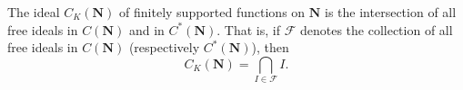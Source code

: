 The ideal $C_K(\mathbf{N})$ of finitely supported functions on $\mathbf{N}$ is the intersection of all free ideals in $C(\mathbf{N})$ and in $C^*(\mathbf{N})$. That is, if $\mathcal{F}$ denotes the collection of all free ideals in $C(\mathbf{N})$ (respectively $C^*(\mathbf{N})$), then
$$C_K(\mathbf{N}) = \bigcap_{I \in \mathcal{F}} I.$$
